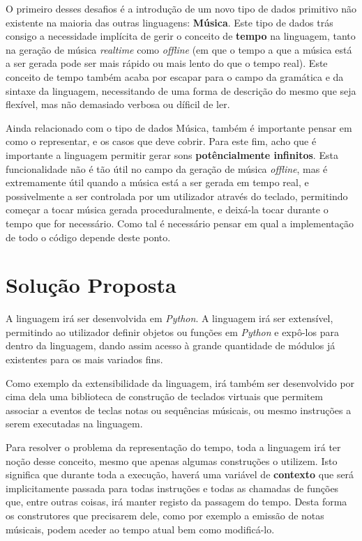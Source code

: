 \documentclass[
  oneside,
  11pt, a4paper,
  footinclude=true,
  headinclude=true,
  cleardoublepage=empty
]{scrbook}
\begin{document}
    O primeiro desses desafios é a introdução de um novo tipo de dados primitivo não existente na maioria das outras linguagens: \textbf{Música}. Este tipo de dados trás consigo a necessidade implícita de gerir o conceito de \textbf{tempo} na linguagem, tanto na geração de música \textit{realtime} como \textit{offline} (em que o tempo a que a música está a ser gerada pode ser mais rápido ou mais lento do que o tempo real). Este conceito de tempo também acaba por escapar para o campo da gramática e da sintaxe da linguagem, necessitando de uma forma de descrição do mesmo que seja flexível, mas não demasiado verbosa ou díficil de ler.
    
    Ainda relacionado com o tipo de dados Música, também é importante pensar em como o representar, e os casos que deve cobrir. Para este fim, acho que é importante a linguagem permitir gerar sons \textbf{potêncialmente infinitos}. Esta funcionalidade não é tão útil no campo da geração de música \textit{offline}, mas é extremamente útil quando a música está a ser gerada em tempo real, e possivelmente a ser controlada por um utilizador através do teclado, permitindo começar a tocar música gerada proceduralmente, e deixá-la tocar durante o tempo que for necessário. Como tal é necessário pensar em qual a implementação de todo o código depende deste ponto.
       

	\section{Solução Proposta}
	A linguagem irá ser desenvolvida em \textit{Python}. A linguagem irá ser extensível, permitindo ao utilizador definir objetos ou funções em \textit{Python} e expô-los para dentro da linguagem, dando assim acesso à grande quantidade de módulos já existentes para os mais variados fins.
	
	Como exemplo da extensibilidade da linguagem, irá também ser desenvolvido por cima dela uma biblioteca de construção de teclados virtuais que permitem associar a eventos de teclas notas ou sequências músicais, ou mesmo instruções a serem executadas na linguagem.
	
	Para resolver o problema da representação do tempo, toda a linguagem irá ter noção desse conceito, mesmo que apenas algumas construções o utilizem. Isto significa que durante toda a execução, haverá uma variável de \textbf{contexto} que será implicitamente passada para todas instruções e todas as chamadas de funções que, entre outras coisas, irá manter registo da passagem do tempo. Desta forma os construtores que precisarem dele, como por exemplo a emissão de notas músicais, podem aceder ao tempo atual bem como modificá-lo.
	
\end{document}
